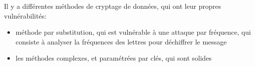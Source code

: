 Il y a diff\'erentes m\'ethodes de cryptage de donn\'ees, qui ont leur propres vuln\'erabilit\'es:
\begin{itemize}
  \item m\'ethode par substitution, qui est vuln\'erable \`a une attaque par fr\'equence, qui consiste \`a analyser la
  fr\'equences des lettres pour d\'echiffrer le message
  \item les m\'ethodes complexes, et param\'etr\'ees par cl\'es, qui sont solides
\end{itemize}
